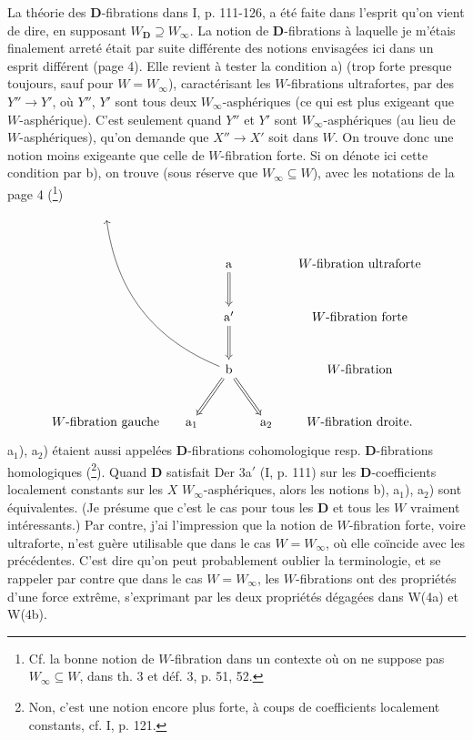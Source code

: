 La théorie des \textbf{D}-fibrations dans I, p. 111-126, a été faite dans l'esprit qu'on vient de dire, en supposant $W_{\mathbf{D}} \supseteq W_\infty$. La notion de \textbf{D}-fibrations à laquelle je m'étais finalement arreté était par suite différente des notions envisagées ici dans un esprit différent (page 4). Elle revient à tester la condition a) (trop forte presque toujours, sauf pour $W = W_\infty$), caractérisant les $W$-fibrations ultrafortes, par des $Y'' \longrightarrow Y'$, où $Y''$, $Y'$ sont tous deux $W_\infty$-asphériques (ce qui est plus exigeant que $W$-asphérique). C'est seulement quand $Y''$ et $Y'$ sont $W_\infty$-asphériques (au lieu de $W$-asphériques), qu'on demande que $X'' \longrightarrow X'$ soit dans $W$. On trouve donc une notion moins exigeante que celle de $W$-fibration forte. Si on dénote ici cette condition par b), on trouve (sous réserve que $W_\infty \subseteq W$), avec les notations de la page 4 (\footnote[39]{Cf. la bonne notion de $W$-fibration dans un contexte où on ne suppose pas $W_\infty \subseteq W$, dans th. 3 et déf. 3, p. 51, 52.}) %
\[
\begin{tikzcd}[column sep=small, row sep=large]
{} & & & & \\
& & \mathrm{a} \arrow[d, Rightarrow] & & W\text{-fibration ultraforte} \\
& & \mathrm{a}' \arrow[d, Rightarrow] & & W\text{-fibration forte} \\
& & \mathrm{b} \arrow[dl, Rightarrow] \arrow[dr, Rightarrow] \arrow[uuull, bend left=30] & & W\text{-fibration} \\
W\text{-fibration gauche} & \mathrm{a}_1 & & \mathrm{a}_2 & W\text{-fibration droite.}
\end{tikzcd}
\]
a$_1$), a$_2$) étaient aussi appelées \textbf{D}-fibrations cohomologique resp. \textbf{D}-fibrations homologiques (\footnote[40]{Non, c'est une notion encore plus forte, à coups de coefficients localement constants, cf. I, p. 121.}). Quand \textbf{D} satisfait Der 3a$'$ (I, p. 111) sur les \textbf{D}-coefficients localement constants sur les $X$ $W_\infty$-asphériques, alors les notions b), a$_1$), a$_2$) sont équivalentes. (Je présume que c'est le cas pour tous les \textbf{D} et tous les $W$ vraiment intéressants.) Par contre, j'ai l'impression que la notion de $W$-fibration forte, voire ultraforte, n'est guère utilisable que dans le cas $W = W_\infty$, où elle coïncide avec les précédentes. C'est dire qu'on peut probablement oublier la terminologie, et se rappeler par contre que dans le cas $W = W_\infty$, les %
$W$-fibrations ont des propriétés d'une force extrême, s'exprimant par les deux propriétés dégagées dans W(4a) et W(4b).

